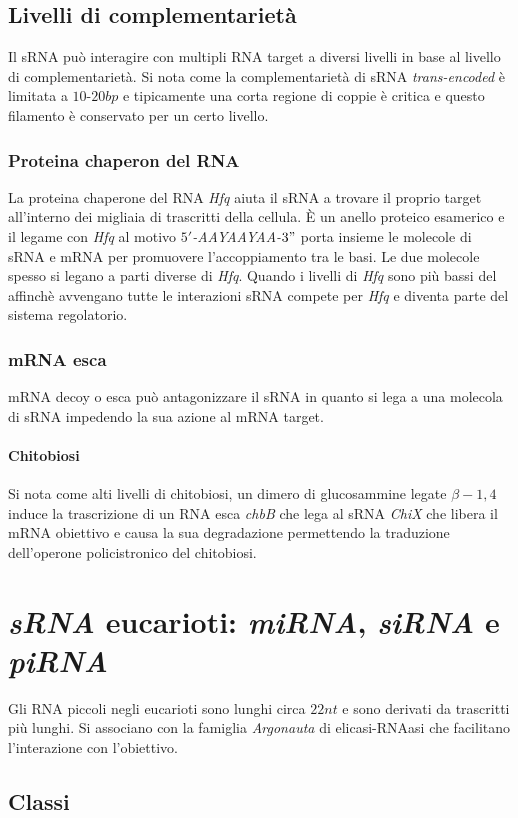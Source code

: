 \subsection{Livelli di complementariet\`a}
Il sRNA pu\`o interagire con multipli RNA target a diversi livelli in base al livello di complementariet\`a. Si nota come la complementariet\`a di sRNA \emph{trans-encoded} \`e limitata
a $10$-$20bp$ e tipicamente una corta regione di coppie \`e critica e questo filamento \`e conservato per un certo livello. 
\subsubsection{Proteina chaperon del RNA}
La proteina chaperone del RNA \emph{Hfq} aiuta il sRNA a trovare il proprio target all'interno dei migliaia di trascritti della cellula. \`E un anello proteico esamerico e il legame
con \emph{Hfq} al motivo \emph{$5'$-AAYAAYAA-$3"$} porta insieme le molecole di sRNA e mRNA per promuovere l'accoppiamento tra le basi. Le due molecole spesso si legano a parti diverse 
di \emph{Hfq}. Quando i livelli di \emph{Hfq} sono pi\`u bassi del affinch\`e avvengano tutte le interazioni sRNA compete per \emph{Hfq} e diventa parte del sistema regolatorio. 
\subsubsection{mRNA esca}
mRNA decoy o esca pu\`o antagonizzare il sRNA in quanto si lega a una molecola di sRNA impedendo la sua azione al mRNA target.
\paragraph{Chitobiosi}
Si nota come alti livelli di chitobiosi, un dimero di glucosammine legate $\beta-1,4$ induce la trascrizione di un RNA esca \emph{chbB} che lega al sRNA \emph{ChiX} che libera il
mRNA obiettivo e causa la sua degradazione permettendo la traduzione dell'operone policistronico del chitobiosi. 
\section{\emph{sRNA} eucarioti: \emph{miRNA}, \emph{siRNA} e \emph{piRNA}}
Gli RNA piccoli negli eucarioti sono lunghi circa $22nt$ e sono derivati da trascritti pi\`u lunghi. Si associano con la famiglia \emph{Argonauta} di elicasi-RNAasi che facilitano
l'interazione con l'obiettivo.
\subsection{Classi}
